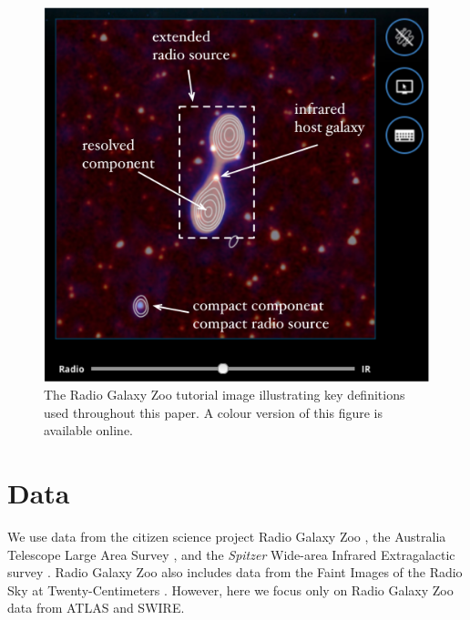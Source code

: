 \documentclass[fleqn,usenatbib,usedcolumn]{mnras}
\begin{document}
  \begin{figure}
  \begin{center}
    \includegraphics[width=0.75\linewidth]{images/fig1.png}
    \caption{The Radio Galaxy Zoo tutorial image illustrating key definitions
      used throughout this paper. A colour version of this figure is available
      online.}\label{fig1}
  \end{center}
  \end{figure}

\section{Data}\label{sec:data}

  We use data from the citizen science project Radio Galaxy Zoo
  \citep{banfield15}, the Australia Telescope Large Area Survey
  \citep[ATLAS;][]{norris06,franzen15}, and the \emph{Spitzer} Wide-area Infrared
  Extragalactic survey \citep[SWIRE;][]{lonsdale03swire, surace05swire}. Radio Galaxy Zoo also includes data from the Faint Images of the
    Radio Sky at Twenty-Centimeters \citep[FIRST;][]{white97first}. However, here we focus only on Radio Galaxy Zoo data from ATLAS and SWIRE.
\end{document}
